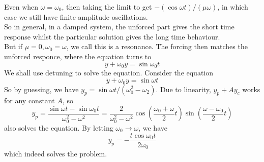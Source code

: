 Even when $\omega=\omega_0$, then taking the limit to get $-(\cos\omega t)/(\mu\omega)$, in which case we still have finite amplitude oscillations.\\
So in general, in a damped system, the unforced part gives the short time response whilst the particular solution gives the long time behaviour.\\
But if $\mu=0,\omega_0=\omega$, we call this is a resonance.
The forcing then matches the unforced responce, where the equation turns to
$$\ddot{y}+\omega_0 y=\sin\omega_0 t$$
We shall use detuning to solve the equation.
Consider the equation
$$\ddot{y}+\omega_0 y=\sin\omega t$$
So by guessing, we have $y_p=\sin\omega t/(\omega_0^2-\omega_2)$.
Due to linearity, $y_p+Ay_c$ works for any constant $A$, so
$$y_p=\frac{\sin\omega t-\sin\omega_0t}{\omega_0^2-\omega^2}=\frac{2}{\omega_0^2-\omega^2}\cos\left(\frac{\omega_0+\omega}{2}t\right)\sin\left(\frac{\omega-\omega_0}{2}t\right)$$
also solves the equation.
By letting $\omega_0\to\omega$, we have
$$y_p=-\frac{t\cos\omega_0t}{2\omega_0}$$
which indeed solves the problem.
